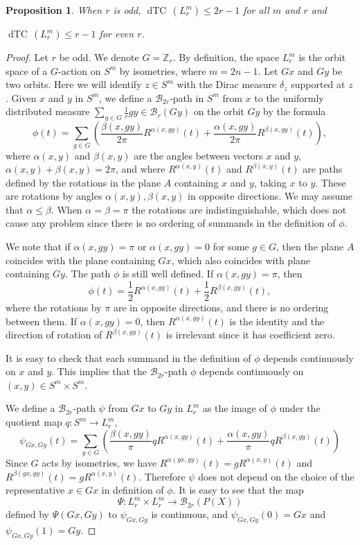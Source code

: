 \documentclass{amsart}
\numberwithin{equation}{section}
\theoremstyle{plain}
\newtheorem{prop}[thm]{Proposition}
\theoremstyle{definition}
\def\dTC{{\mathop\mathrm{dTC}\,}}
\begin{document}
\begin{prop}\label{2p-1}
When $r$ is odd,
$\dTC(L^m_r)\le 2r-1$ for all $m$ and  $r$ and

$\dTC(L^m_r)\le r-1$ for even $r$.
\end{prop}
\begin{proof}
Let $r$ be odd.
We denote $G=\mathbb Z_r$.
By definition, the space $L^m_r$ is the orbit space of a $G$-action on $S^m$ by isometries, where $m=2n-1$. 
Let $Gx$ and $Gy$ be two orbits. 
Here we will identify $z\in S^m$ with the Dirac measure $\delta_z$ supported at $z$.
Given $x$ and $y$ in $S^m$, we define a $\mathcal B_{2r}$-path in $S^m$ from $x$ to the uniformly distributed measure $\sum_{g\in G}\frac{1}{r}gy\in\mathcal B_r(Gy)$
on the orbit $Gy$
 by the formula
$$
\phi(t)=\sum_{g\in G}\left(\frac{\beta(x,gy)}{2\pi}R^{\alpha
(x,gy)}(t)+\frac{\alpha(x,gy)}{2\pi}R^{\beta(x,gy)}(t)\right),
$$
where $\alpha(x,y)$ and $\beta(x,y)$ are the angles between vectors $x$ and $y$,
$\alpha(x,y)+\beta(x,y)=2\pi$, and where $R^{\alpha(x,y)}(t)$ and $R^{\beta(x,y)}(t)$ are paths defined by the rotations in the plane $A$ containing  $x$ and $y$, taking $x$ to $y$. These are rotations by angles $\alpha(x,y),\beta(x,y)$ in opposite directions. We may assume that $\alpha\le\beta$.  When $\alpha=\beta=\pi$ the rotations are indistinguishable, which does not cause any problem since there is no ordering of summands in the definition of $\phi$.
 



We note that if $\alpha(x,gy)=\pi$ or $\alpha(x,gy)=0$ for some $g\in G$, then the plane $A$ coincides with the plane containing $Gx$, which also coincides with plane containing $Gy$. The path $\phi$ is still well defined. If $\alpha(x,gy)=\pi$, then $$\phi(t)=\frac{1}{2}R^{\alpha(x,gy)}(t)+\frac{1}{2}R^{\beta(x,gy)}(t),$$ where the rotations by $\pi$ are in opposite directions, and there is no ordering between them. If $\alpha(x,gy)=0$, then $R^{\alpha(x,gy)}(t)$ is the identity and the direction of rotation of $R^{\beta(x,gy)}(t)$
is irrelevant since it has coefficient zero.

It is easy to check that each summand in the definition of $\phi$ depends continuously on $x$ and $y$. This implies that the $\mathcal B_{2r}$-path $\phi$  depends continuously on $(x,y)\in S^m\times S^m$.


We define a $\mathcal B_{2r}$-path $\psi$ from $Gx$ to $Gy$ in $L^m_r$ as the image of $\phi$ under the quotient map $q:S^m\to L^m_r$,
$$
\psi_{Gx,Gy}(t)=\sum_{g\in G}\left(\frac{\beta(x,gy)}{\pi}qR^{\alpha(x,gy)}(t)+\frac{\alpha(x,gy)}{\pi}qR^{\beta(x,gy)}(t)\right)
$$
Since $G$ acts by isometries, we have $R^{\alpha(gx,gy)}(t)=gR^{\alpha(x,y)}(t)$ and
$R^{\beta(gx,gy)}(t)=gR^{\alpha(x,y)}(t)$. Therefore $\psi$ does not depend on the choice of the representative $x\in Gx$ in definition of $\phi$. It is easy to see that the map
$$\Psi:L^m_r\times L^m_r\to\mathcal B_{2r}(P(X))$$ defined by $\Psi(Gx,Gy)$ to $\psi_{Gx,Gy}$ is continuous,
and $\psi_{Gx,Gy}(0)=Gx$ and $ \psi_{Gx,Gy}(1)=Gy$.


\end{proof}
\end{document}
